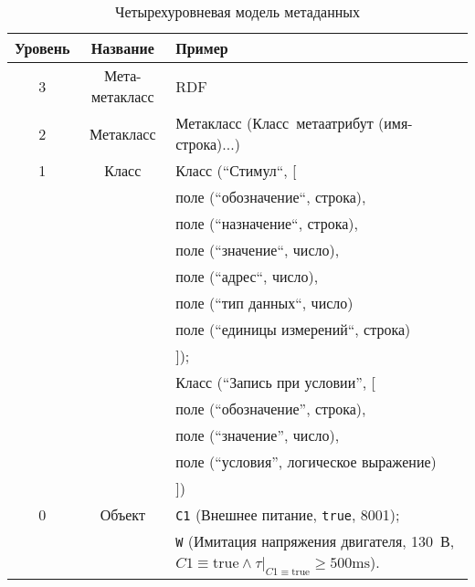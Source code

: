 \begin{longtable}{|c|c|p{}|}
    \caption{Четырехуровневая модель метаданных}\label{tbl:meta_data_levels} \\
    \hline\textbf{Уровень} & \textbf{Название} & \textbf{Пример} \\\hline\endhead
    3 & Мета-метакласс & RDF \\\hline
    2 & Метакласс & Метакласс (Класс~метаатрибут (имя-строка)...) \\\hline
    1 & Класс & Класс (``Стимул``, [\\
                &&\hspace{5mm}поле (``обозначение``, строка), \\
                &&\hspace{5mm}поле (``назначение``, строка), \\
                &&\hspace{5mm}поле (``значение``, число),\\
                &&\hspace{5mm}поле (``адрес``, число),\\
                &&\hspace{5mm}поле (``тип данных``, число)\\
                &&\hspace{5mm}поле (``единицы измерений``, строка)\\
            &&]);\\
            &&Класс (``Запись при условии'', [\\
                &&\hspace{5mm}поле (``обозначение'', строка),\\
                &&\hspace{5mm}поле (``значение'', число),\\
                &&\hspace{5mm}поле (``условия'', логическое выражение)\\
            &&])\\\hline
    0 & Объект & 
        \texttt{C1} (Внешнее питание, \texttt{true}, 8001); \\
        &&\texttt{W} (Имитация напряжения двигателя, 130~В, $C1 \equiv \mbox{true} \wedge \tau|_{C1\equiv\mbox{true}} \ge 500\mbox{ms}$).
        \\\hline
\end{longtable}


